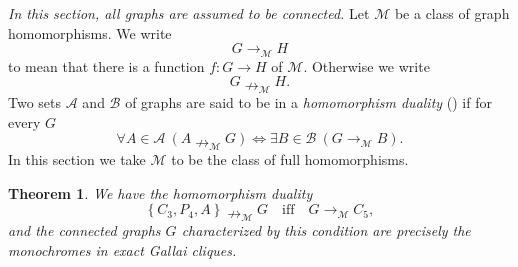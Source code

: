 \documentclass[12pt]{amsart}
\newtheorem{theorem}{Theorem}[section]
\theoremstyle{plain}
\numberwithin{equation}{section}
\begin{document}
\emph{In this section, all graphs are assumed to be connected.} Let
$\mathcal{M}$ be a class of graph homomorphisms. We write
\begin{displaymath}
    G\rightarrow_{\mathcal{M}}H
\end{displaymath}
to mean that there is a function $f:G\rightarrow H$ of $\mathcal{M}$.
Otherwise we write
\begin{displaymath}
    G\nrightarrow_{\mathcal{M}}H.
\end{displaymath}
Two sets $\mathcal{A}$ and $\mathcal{B}$ of graphs are said to be in a
\emph{homomorphism duality} (\cite{NesetrilPultr:1978}) if for every $G$
\begin{displaymath}
    \forall A\in\mathcal{A}\ \left(  A\nrightarrow_{\mathcal{M}}G\right)
    \Longleftrightarrow\exists B\in\mathcal{B}\ \left(
    G\rightarrow_{\mathcal{M}}B\right)  .
\end{displaymath}
In this section we take $\mathcal{M}$ to be the class of full homomorphisms.

\begin{theorem}
We have the homomorphism duality
\begin{displaymath}
    \left\{  C_{3},P_{4},A\right\}  \nrightarrow_{\mathcal{M}}G\quad
    \text{iff}\quad G\rightarrow_{\mathcal{M}}C_{5},
\end{displaymath}
and the connected graphs $G$ characterized by this condition are precisely the
mono\-chromes in exact Gallai cliques.
\end{theorem}
\end{document}

